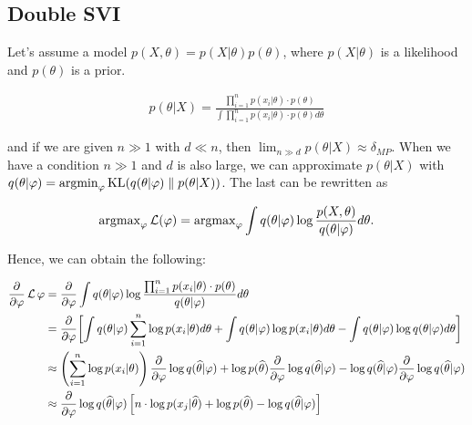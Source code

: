 \subsection{Double SVI}

Let's assume a model $p(X, \theta) = p(X | \theta) p(\theta)$, where $p(X | \theta)$ is a likelihood and $p(\theta)$ is a prior. 

\begin{equation*}
    \begin{aligned}
        p(\theta | X) = \frac{\prod_{i = 1}^n p(x_i | \theta) \cdot p(\theta)}{\int \prod_{i = 1}^n p(x_i | \theta) \cdot p(\theta) d\theta} 
    \end{aligned}
\end{equation*}

and if we are given $n \gg 1$ with $d \ll n$, then $\lim_{n \gg d} p(\theta | X) \approx \delta_{MP}$. When we have a condition $n \gg 1$ and $d$ is also large, we can approximate $p(\theta | X)$ with $q(\theta | \varphi) = \operatorname{argmin}_{\varphi} \operatorname{KL}(q(\theta | \varphi) \parallel p(\theta | X))$. The last can be rewritten as

\begin{equation*}
    \begin{aligned}
        \operatorname{argmax}_{\varphi} \operatorname{\mathcal{L}}(\varphi) = \operatorname{argmax}_{\varphi} \int q(\theta | \varphi) \log \frac{p(X, \theta)}{q(\theta | \varphi)} d\theta .
    \end{aligned}
\end{equation*}

Hence, we can obtain the following:

\begin{equation}
    \begin{aligned}
        \frac{\partial}{\partial \varphi} \operatorname{\mathcal{L}} \varphi &= \frac{\partial}{\partial \varphi} \int q(\theta | \varphi) \log \frac{\prod_{i = 1}^n p(x_i | \theta) \cdot p(\theta)}{q(\theta | \varphi)} d\theta \\ 
        &= \frac{\partial}{\partial \varphi} \biggl[ \int q(\theta | \varphi) \sum_{i = 1}^n \log p(x_i | \theta) d\theta +  \int q(\theta | \varphi) \log p(x_i | \theta) d \theta - \int q (\theta | \varphi) \log q(\theta | \varphi) d \theta \biggr] \\ 
        &\approx \left( \sum_{i = 1}^n \log p(x_i | \theta) \right) \frac{\partial}{\partial \varphi} \log q(\widehat{\theta} | \varphi) + \log p(\widehat{\theta}) \frac{\partial}{\partial \varphi} \log q(\widehat{\theta} | \varphi) - \log q(\widehat{\theta} | \varphi) \frac{\partial}{\partial \varphi} \log q(\widehat{\theta} | \varphi) \\ 
        &\approx \frac{\partial}{\partial \varphi} \log q(\widehat{\theta} | \varphi) \left[ n \cdot \log p(x_j | \widehat{\theta}) + \log p(\widehat{\theta}) - \log q(\widehat{\theta} | \varphi) \right] \\
    \end{aligned}
\end{equation}

